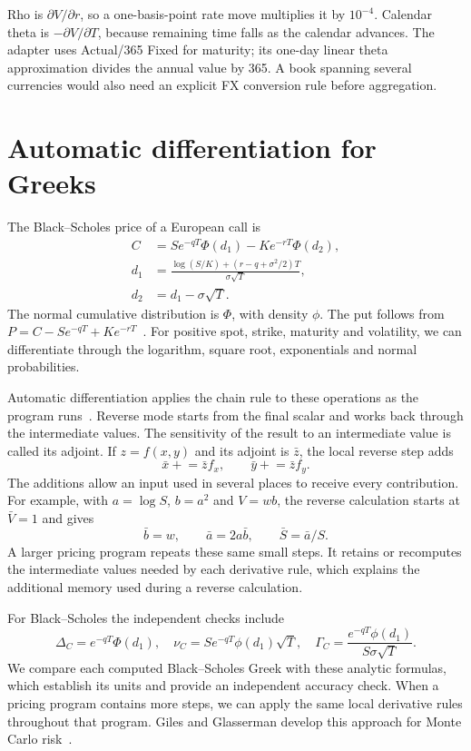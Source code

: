 \documentclass[8pt]{strategynet-journal}
\begin{document}
\begin{SNcolumns}
Rho is $\partial V/\partial r$,
so a one-basis-point rate move multiplies it by $10^{-4}$. Calendar theta is
$-\partial V/\partial T$, because remaining time falls as the calendar advances.
The adapter uses Actual/365 Fixed for maturity; its one-day linear theta
approximation divides the annual value by 365. A book spanning several
currencies would also need an explicit FX conversion rule before aggregation.

\section{Automatic differentiation for Greeks}
The Black--Scholes price of a European call is
\begin{align}
 C&=Se^{-qT}\Phi(d_1)-Ke^{-rT}\Phi(d_2),\label{eq:bs}\\
 d_1&=\frac{\log(S/K)+(r-q+\sigma^2/2)T}{\sigma\sqrt T},\nonumber\\
 d_2&=d_1-\sigma\sqrt T.\nonumber
\end{align}
The normal cumulative distribution is $\Phi$, with density $\phi$.
The put follows from $P=C-Se^{-qT}+Ke^{-rT}$~\cite{blackscholes}.
For positive spot, strike, maturity and volatility, we can differentiate
through the logarithm, square root, exponentials and normal probabilities.

Automatic differentiation applies the chain rule to these operations as the
program runs~\cite{baydin}. Reverse mode starts from the final scalar and
works back through the intermediate values. The sensitivity of the result to
an intermediate value is called its adjoint. If $z=f(x,y)$ and its adjoint is
$\bar z$, the local reverse step adds
\[
 \bar x\mathrel{+}=\bar z f_x,\qquad
 \bar y\mathrel{+}=\bar z f_y.
\]
The additions allow an input used in several places to receive every
contribution. For example, with $a=\log S$, $b=a^2$ and $V=wb$, the reverse
calculation starts at $\bar V=1$ and gives
\[
 \bar b=w,\qquad \bar a=2a\bar b,\qquad \bar S=\bar a/S.
\]
A larger pricing program repeats these same small steps. It retains or
recomputes the intermediate values needed by each derivative rule, which
explains the additional memory used during a reverse calculation.

For Black--Scholes the independent checks include
\[
 \Delta_C=e^{-qT}\Phi(d_1),\quad
 \nu_C=Se^{-qT}\phi(d_1)\sqrt T,\quad
 \Gamma_C=\frac{e^{-qT}\phi(d_1)}{S\sigma\sqrt T}.
\]
We compare each computed Black--Scholes Greek with these analytic formulas,
which establish its units and provide an independent accuracy check. When a
pricing program contains more steps, we can apply the same local derivative
rules throughout that program. Giles and Glasserman develop this approach
for Monte Carlo risk~\cite{gilesglasserman}.


\end{SNcolumns}
\end{document}
